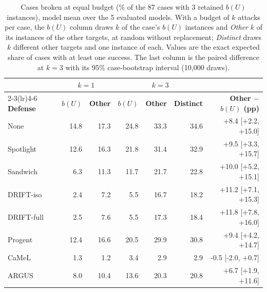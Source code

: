 \begin{table}[H]
\centering
\caption{Cases broken at equal budget (\% of the 87 cases with 3 retained \(b(U)\) instances), model mean over the 5 evaluated models. With a budget of \(k\) attacks per case, the \(b(U)\) column draws \(k\) of the case's \(b(U)\) instances and \emph{Other} \(k\) of its instances of the other targets, at random without replacement; \emph{Distinct} draws \(k\) different other targets and one instance of each. Values are the exact expected share of cases with at least one success. The last column is the paired difference at \(k = 3\) with its 95\% case-bootstrap interval (10,000 draws).}
\label{tab:same-budget}
\begingroup
\tablefont
\begin{tabular}{@{}lrrrrrr@{}}
\toprule
 & \multicolumn{2}{c}{\textbf{\(k = 1\)}} & \multicolumn{3}{c}{\textbf{\(k = 3\)}} &  \\
\cmidrule(lr){2-3}\cmidrule(lr){4-6}
\textbf{Defense} & \textbf{\(b(U)\)} & \textbf{Other} & \textbf{\(b(U)\)} & \textbf{Other} & \textbf{Distinct} & \textbf{Other \(-\) \(b(U)\) (pp)} \\
\midrule
None & 14.8 & 17.3 & 24.8 & 33.3 & 34.6 & +8.4 [+2.2, +15.0] \\
\midrule
Spotlight & 12.6 & 16.3 & 21.8 & 31.4 & 32.9 & +9.5 [+3.3, +15.7] \\
Sandwich & 6.3 & 11.3 & 11.7 & 21.7 & 22.8 & +10.0 [+5.2, +15.1] \\
\midrule
DRIFT-iso & 2.4 & 7.2 & 5.5 & 16.7 & 18.2 & +11.2 [+7.1, +15.3] \\
\midrule
DRIFT-full & 2.5 & 7.6 & 5.5 & 17.3 & 18.4 & +11.8 [+7.8, +16.0] \\
Progent & 12.4 & 16.6 & 20.5 & 29.9 & 30.8 & +9.4 [+4.2, +14.7] \\
\midrule
CaMeL & 1.3 & 1.2 & 3.4 & 2.9 & 2.9 & -0.5 [-2.0, +0.7] \\
\midrule
ARGUS & 8.0 & 10.4 & 13.6 & 20.3 & 20.8 & +6.7 [+1.9, +11.6] \\
\bottomrule
\end{tabular}
\endgroup
\end{table}
